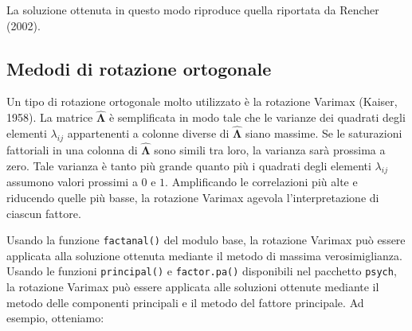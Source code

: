 \documentclass[
  11pt,
]{krantz}
\theoremstyle{definition}
\theoremstyle{definition}
\theoremstyle{definition}
\theoremstyle{definition}
\theoremstyle{remark}
\begin{document}
La soluzione ottenuta in questo modo riproduce quella riportata da Rencher (2002).

\hypertarget{medodi-di-rotazione-ortogonale}{%
\subsection{Medodi di rotazione ortogonale}\label{medodi-di-rotazione-ortogonale}}

Un tipo di rotazione ortogonale molto utilizzato è la rotazione Varimax (Kaiser, 1958). La matrice \(\hat{\boldsymbol{\Lambda}}\) è semplificata in modo tale che le varianze dei quadrati degli elementi \(\lambda_{ij}\) appartenenti a colonne diverse di \(\hat{\boldsymbol{\Lambda}}\) siano massime. Se le saturazioni fattoriali in una colonna di \(\hat{\boldsymbol{\Lambda}}\) sono simili tra loro, la varianza sarà prossima a zero. Tale varianza è tanto più grande quanto più i quadrati degli elementi \(\lambda_{ij}\) assumono valori prossimi a \(0\) e \(1\). Amplificando le correlazioni più alte e riducendo quelle più basse, la rotazione Varimax agevola l'interpretazione di ciascun fattore.

Usando la funzione \texttt{factanal()} del modulo base, la rotazione Varimax può essere applicata alla soluzione ottenuta mediante il metodo di massima verosimiglianza. Usando le funzioni \texttt{principal()} e \texttt{factor.pa()} disponibili nel pacchetto \texttt{psych}, la rotazione Varimax può essere applicata alle soluzioni ottenute mediante il metodo delle componenti principali e il metodo del fattore principale. Ad esempio, otteniamo:
\end{document}
